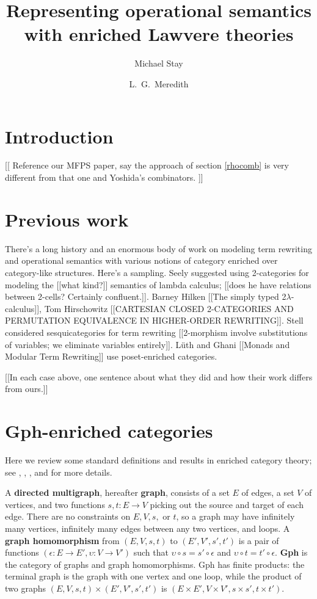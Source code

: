 \documentclass[a4paper,UKenglish]{lipics-v2016}
\title{Representing operational semantics with enriched Lawvere theories}
\author[1]{
Michael Stay
}
\author[2]{
L.\ G.\ Meredith
}
\affil[1]{
  Pyrofex Corp., Kirkland, WA, USA\\
  {\tt stay@pyrofex.net}
}
\affil[2]{
{RChain Cooperative}\\
{\tt greg@rchain.coop}
}
\newcommand{\maps}{\colon}
\begin{document}
\maketitle
\begin{abstract}
\noindent
\end{abstract}
\EnableBpAbbreviations

\section{Introduction}
[[ Reference our MFPS paper, say the approach of section \ref{rhocomb} is very different from that one and Yoshida's combinators. ]]

\section{Previous work}
There's a long history and an enormous body of work on modeling term rewriting and operational semantics with various notions of category enriched over category-like structures.  Here's a sampling.  Seely \cite{Seely} suggested using 2-categories for modeling the [[what kind?]] semantics of lambda calculus; [[does he have relations between 2-cells?  Certainly confluent.]].  Barney Hilken [[The simply typed 2$\lambda$-calculus]], Tom Hirschowitz [[CARTESIAN CLOSED 2-CATEGORIES AND PERMUTATION EQUIVALENCE IN HIGHER-ORDER REWRITING]].  Stell \cite{Stell}
considered sesquicategories for term rewriting [[2-morphism involve substitutions of variables; we eliminate variables entirely]].  L\"uth and Ghani [[Monads and Modular Term Rewriting]] use poset-enriched categories.

[[In each case above, one sentence about what they did and how their work differs from ours.]]

\section{Gph-enriched categories}
Here we review some standard definitions and results in enriched category theory; see \cite{CIS-335497}, \cite{Power99EnrichedLawvereTheories}, \cite{DBLP:journals/acs/LackR11}, and \cite{Trimble} for more details.

A {\bf directed multigraph}, hereafter {\bf graph}, consists of a set $E$ of edges, a set $V$ of vertices, and two functions $s,t\maps E \to V$ picking out the source and target of each edge.  There are no constraints on $E, V, s,$ or $t$, so a graph may have infinitely many vertices, infinitely many edges between any two vertices, and loops.  A {\bf graph homomorphism} from $(E, V, s, t)$ to $(E', V', s', t')$ is a pair of functions $(\epsilon\maps E \to E', \upsilon\maps V \to V')$ such that $\upsilon\circ s = s' \circ \epsilon$ and $\upsilon\circ t = t' \circ \epsilon$.  {\bf Gph} is the category of graphs and graph homomorphisms.  Gph has finite products: the terminal graph is the graph with one vertex and one loop, while the product of two graphs $(E, V, s, t) \times (E', V', s', t')$ is $(E \times E', V \times V', s \times s', t\times t').$
\end{document}
